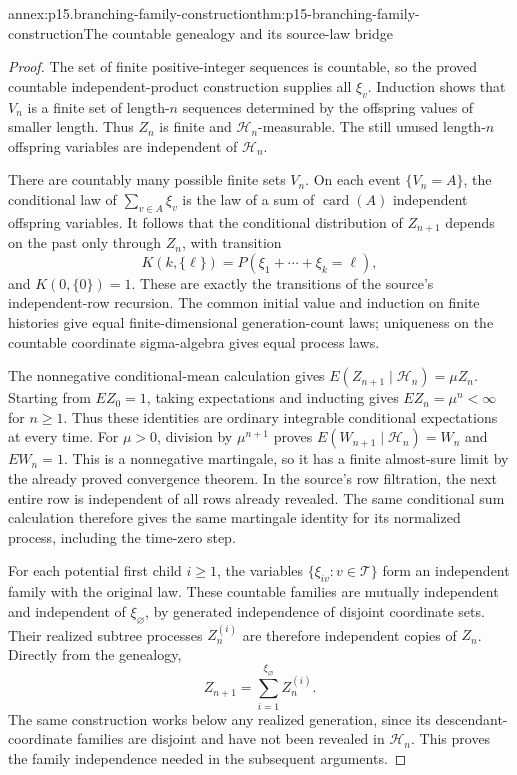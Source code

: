\begin{annexitem}{annex:p15.branching-family-construction}{thm:p15-branching-family-construction}{The countable genealogy and its source-law bridge}
\begin{proof}
The set of finite positive-integer sequences is countable, so the
proved countable independent-product construction supplies all
\(\xi_v\). Induction shows that \(V_n\) is a finite set of
length-\(n\) sequences determined by the offspring values of smaller
length. Thus \(Z_n\) is finite and \(\mathcal H_n\)-measurable.
The still unused length-\(n\) offspring variables are independent
of \(\mathcal H_n\).

There are countably many possible finite sets \(V_n\).
On each event \(\{V_n=A\}\), the conditional law of
\(\sum_{v\in A}\xi_v\) is the law of a sum of
\(\operatorname{card}(A)\) independent offspring variables.
It follows that the conditional distribution of \(Z_{n+1}\)
depends on the past only through \(Z_n\), with transition
\[
              K(k,\{\ell\})=P(\xi_1+\cdots+\xi_k=\ell),
\]
and \(K(0,\{0\})=1\). These are exactly the transitions of the
source's independent-row recursion. The common initial value
and induction on finite histories give equal finite-dimensional
generation-count laws; uniqueness on the countable coordinate
sigma-algebra gives equal process laws.

The nonnegative conditional-mean calculation gives
\(E(Z_{n+1}\mid\mathcal H_n)=\mu Z_n\).
Starting from \(EZ_0=1\), taking expectations and inducting gives
\(EZ_n=\mu^n<\infty\) for \(n\geq1\). Thus these identities
are ordinary integrable conditional expectations at every time.
For \(\mu>0\), division by \(\mu^{n+1}\) proves
\(E(W_{n+1}\mid\mathcal H_n)=W_n\) and \(EW_n=1\).
This is a nonnegative martingale, so it has a finite almost-sure
limit by the already proved convergence theorem.
In the source's row filtration, the next entire row is independent
of all rows already revealed. The same conditional sum calculation
therefore gives the same martingale identity for its normalized process,
including the time-zero step.

For each potential first child \(i\geq1\), the variables
\(\{\xi_{iv}:v\in\mathcal T\}\) form an independent family with
the original law. These countable families are mutually
independent and independent of \(\xi_\varnothing\), by generated
independence of disjoint coordinate sets.
Their realized subtree processes \(Z_n^{(i)}\) are therefore
independent copies of \(Z_n\). Directly from the genealogy,
\[
                    Z_{n+1}=\sum_{i=1}^{\xi_\varnothing}Z_n^{(i)}.
\]
The same construction works below any realized generation, since
its descendant-coordinate families are disjoint and have not
been revealed in \(\mathcal H_n\). This proves the family
independence needed in the subsequent arguments.
\end{proof}
\end{annexitem}

